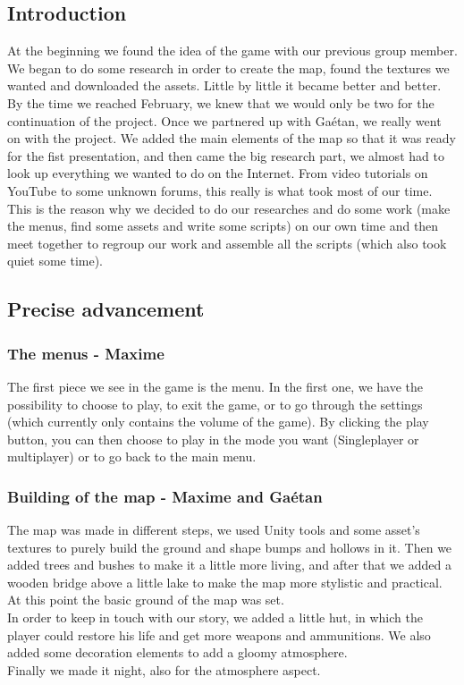 \documentclass[12pt]{article}
\begin{document}
\subsection{Introduction}

   At the beginning we found the idea of the game with our previous group member. We began to do some research in order to create the map, found the textures we wanted and downloaded the assets. Little by little it became better and better.\\
By the time we reached February, we knew that we would only be two for the continuation of the project. Once we partnered up with Ga\'etan, we really went on with the project.
We added the main elements of the map so that it was ready for the fist presentation, and then came the big research part, we almost had to look up everything we wanted to do on the Internet. From video tutorials on YouTube to some unknown forums, this really is what took most of our time. This is the reason why we decided to do our researches and do some work (make the menus, find some assets and write some scripts) on our own time and then meet together to regroup our work and assemble all the scripts (which also took quiet some time).\\

\bigskip
\bigskip

\subsection{Precise advancement}
	\subsubsection{The menus - Maxime}

		The first piece we see in the game is the menu. In the first one, we have the possibility to choose to play, to exit the game, or to go through the settings (which currently only contains the volume of the game).
        By clicking the play button, you can then choose to play in the mode you want (Singleplayer or multiplayer) or to go back to the main menu.
        
        \newpage

	\subsubsection{Building of the map - Maxime and Ga\'etan}
    
    	The map was made in different steps, we used Unity tools and some asset's textures to purely build the ground and shape bumps and hollows in it. Then we added trees and bushes to make it a little more living, and after that we added a wooden bridge above a little lake to make the map more stylistic and practical. At this point the basic ground of the map was set.\\
    	In order to keep in touch with our story, we added a little hut, in which the player could restore his life and get more weapons and ammunitions. We also added some decoration elements to add a gloomy atmosphere.\\
    	Finally we made it night, also for the atmosphere aspect.
        \bigskip
\end{document}
